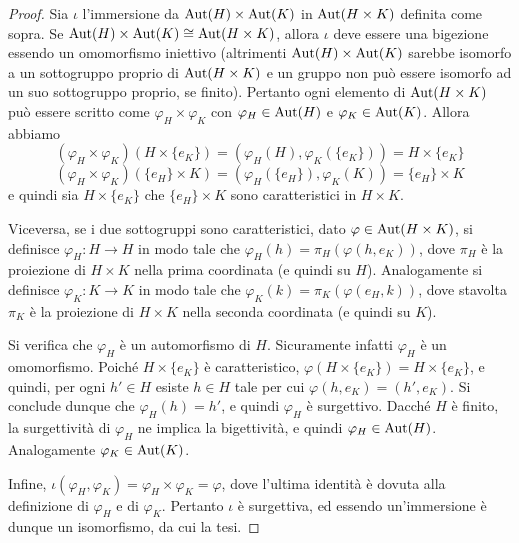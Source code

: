 \documentclass[11pt]{scrartcl}
\begin{document}
	\begin{proof}
		Sia $\iota$ l'immersione da $\operatorname{Aut}(H)\times \operatorname{Aut}(K)$ in $\operatorname{Aut}(H\times K)$ 
		definita come sopra. Se $\operatorname{Aut}(H) \times \operatorname{Aut}(K) \cong \operatorname{Aut}(H \times K)$, allora
		$\iota$ deve essere una bigezione essendo un omomorfismo iniettivo (altrimenti
		$\operatorname{Aut}(H) \times \operatorname{Aut}(K)$ sarebbe isomorfo a un sottogruppo proprio di
		$\operatorname{Aut}(H \times K)$ e un gruppo non può essere isomorfo ad un suo sottogruppo
		proprio, se finito). Pertanto ogni elemento di 
		$\operatorname{Aut}(H\times K)$ può essere scritto come $\varphi_H \times \varphi_K$ con
		$\varphi_H \in \operatorname{Aut}(H)$ e $\varphi_K \in \operatorname{Aut}(K)$. Allora abbiamo 
		\[
		(\varphi_H \times \varphi_K)(H\times\{e_K\}) = 
		(\varphi_H(H), \varphi_K(\{e_K\})) = H\times\{e_K\}
		\]
		\[
		(\varphi_H \times \varphi_K)(\{e_H\}\times K) = 
		(\varphi_H(\{e_H\}), \varphi_K(K)) = \{e_H\}\times K
		\]e quindi sia $H\times\{e_K\}$ che $\{e_H\}\times K$ sono caratteristici in
		$H\times K$. \medskip
		
		
		Viceversa, se i due sottogruppi sono caratteristici, dato
		$\varphi \in \operatorname{Aut}(H\times K)$, si definisce $\varphi_H : H \to H$ in modo
		tale che $\varphi_H(h) = \pi_H(\varphi(h, e_K))$, dove $\pi_H$ è la proiezione
		di $H \times K$ nella prima coordinata (e quindi su $H$). Analogamente si
		definisce $\varphi_K : K \to K$ in modo tale che $\varphi_K(k) = \pi_K(\varphi(e_H, k))$, dove stavolta $\pi_K$ è la proiezione di $H \times K$ nella seconda coordinata
		(e quindi su $K$). \medskip
		
		
		Si verifica che $\varphi_H$ è un automorfismo di $H$. Sicuramente infatti
		$\varphi_H$ è un omomorfismo. Poiché $H \times \{e_K\}$ è caratteristico,
		$\varphi(H \times \{e_K\}) = H \times \{e_K\}$, e quindi, per ogni $h' \in H$
		esiste $h \in H$ tale per cui $\varphi(h, e_K) = (h', e_K)$. Si conclude
		dunque che $\varphi_H(h) = h'$, e quindi $\varphi_H$ è surgettivo. Dacché
		$H$ è finito, la surgettività di $\varphi_H$ ne implica la bigettività, e quindi
		$\varphi_H \in \operatorname{Aut}(H)$. Analogamente $\varphi_K \in \operatorname{Aut}(K)$. \medskip
		
		
		Infine, $\iota(\varphi_H, \varphi_K) = \varphi_H \times \varphi_K = \varphi$,
		dove l'ultima identità è dovuta alla definizione di $\varphi_H$ e
		di $\varphi_K$. Pertanto $\iota$ è surgettiva, ed essendo un'immersione è dunque
		un isomorfismo, da cui la tesi.
	\end{proof}
	
\end{document}
